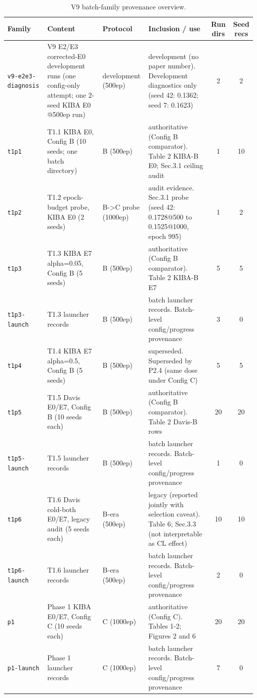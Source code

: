 \begin{table}[!h]
\centering\scriptsize
\caption{V9 batch-family provenance overview.}
\label{tab:v9_family_overview}
\begin{tabular}{p{2.6cm}p{4.6cm}p{2.0cm}p{3.4cm}cc}
\toprule
Family & Content & Protocol & Inclusion / use & Run dirs & Seed recs \\
\midrule
\texttt{v9-e2e3-diagnosis} & V9 E2/E3 corrected-E0 development runs (one config-only attempt; one 2-seed KIBA E0 @500ep run) & development (500ep) & development (no paper number). Development diagnostics only (seed 42: 0.1362; seed 7: 0.1623) & 2 & 2 \\
\texttt{t1p1} & T1.1 KIBA E0, Config B (10 seeds; one batch directory) & B (500ep) & authoritative (Config B comparator). Table 2 KIBA-B E0; Sec.3.1 ceiling audit & 1 & 10 \\
\texttt{t1p2} & T1.2 epoch-budget probe, KIBA E0 (2 seeds) & B->C probe (1000ep) & audit evidence. Sec.3.1 probe (seed 42: 0.1728@500 to 0.1525@1000, epoch 995) & 1 & 2 \\
\texttt{t1p3} & T1.3 KIBA E7 alpha=0.05, Config B (5 seeds) & B (500ep) & authoritative (Config B comparator). Table 2 KIBA-B E7 & 5 & 5 \\
\texttt{t1p3-launch} & T1.3 launcher records & B (500ep) & batch launcher records. Batch-level config/progress provenance & 3 & 0 \\
\texttt{t1p4} & T1.4 KIBA E7 alpha=0.5, Config B (5 seeds) & B (500ep) & superseded. Superseded by P2.4 (same dose under Config C) & 5 & 5 \\
\texttt{t1p5} & T1.5 Davis E0/E7, Config B (10 seeds each) & B (500ep) & authoritative (Config B comparator). Table 2 Davis-B rows & 20 & 20 \\
\texttt{t1p5-launch} & T1.5 launcher records & B (500ep) & batch launcher records. Batch-level config/progress provenance & 1 & 0 \\
\texttt{t1p6} & T1.6 Davis cold-both E0/E7, legacy audit (5 seeds each) & B-era (500ep) & legacy (reported jointly with selection caveat). Table 6; Sec.3.3 (not interpretable as CL effect) & 10 & 10 \\
\texttt{t1p6-launch} & T1.6 launcher records & B-era (500ep) & batch launcher records. Batch-level config/progress provenance & 2 & 0 \\
\texttt{p1} & Phase 1 KIBA E0/E7, Config C (10 seeds each) & C (1000ep) & authoritative (Config C). Tables 1-2; Figures 2 and 6 & 20 & 20 \\
\texttt{p1-launch} & Phase 1 launcher records & C (1000ep) & batch launcher records. Batch-level config/progress provenance & 7 & 0 \\

\end{tabular}
\end{table}
